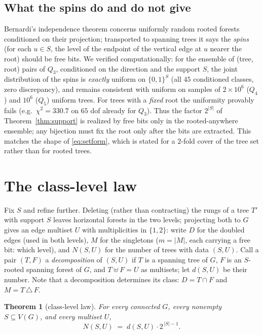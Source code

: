 \documentclass[11pt]{amsart}
\newtheorem{theorem}{Theorem}[section]
\theoremstyle{definition}
\begin{document}
\subsection{What the spins do and do not give}

Bernardi's independence theorem \cite[Thm.~1]{bernardi} concerns uniformly
random rooted forests conditioned on their projection; transported to
spanning trees it says the \emph{spins} (for each $u\in S$, the level of
the endpoint of the vertical edge at $u$ nearer the root) should be free
bits. We verified computationally: for the ensemble of (tree, root) pairs
of $Q_3$, conditioned on the direction and the support $S$, the joint
distribution of the spins is \emph{exactly} uniform on $\{0,1\}^S$ (all
$45$ conditioned classes, zero discrepancy), and remains consistent with
uniform on samples of $2\times10^6$ ($Q_4$) and $10^6$ ($Q_5$) uniform
trees. For trees with a \emph{fixed} root the uniformity provably fails
(e.g.\ $\chi^2=330.7$ on $65$ dof already for $Q_3$). Thus the factor
$2^{|S|}$ of Theorem~\ref{thm:support} is realized by free bits only in the
rooted-anywhere ensemble; any bijection must fix the root only after the
bits are extracted. This matches the shape of \eqref{eq:setform}, which is
stated for a $2$-fold cover of the tree set rather than for rooted trees.

\section{The class-level law}\label{sec:fine}

Fix $S$ and refine further. Deleting (rather than contracting) the rungs of
a tree $T'$ with support $S$ leaves horizontal forests in the two levels;
projecting both to $G$ gives an edge multiset $U$ with multiplicities in
$\{1,2\}$: write $D$ for the doubled edges (used in both levels), $M$ for
the singletons ($m = |M|$, each carrying a free bit: which level), and
$N(S,U)$ for the number of trees with data $(S,U)$. Call a pair $(T,F)$ a
\emph{decomposition} of $(S,U)$ if $T$ is a spanning tree of $G$, $F$ is an
$S$-rooted spanning forest of $G$, and $T \uplus F = U$ as multisets; let
$d(S,U)$ be their number. Note that a decomposition determines its class:
$D = T\cap F$ and $M = T \,\triangle\, F$.

\begin{theorem}[class-level law]\label{thm:classlaw}
For every connected $G$, every nonempty $S \subseteq V(G)$, and every
multiset $U$,
\[
  N(S,U) \;=\; d(S,U)\cdot 2^{\,|S|-1}.
\]
\end{theorem}
\end{document}
